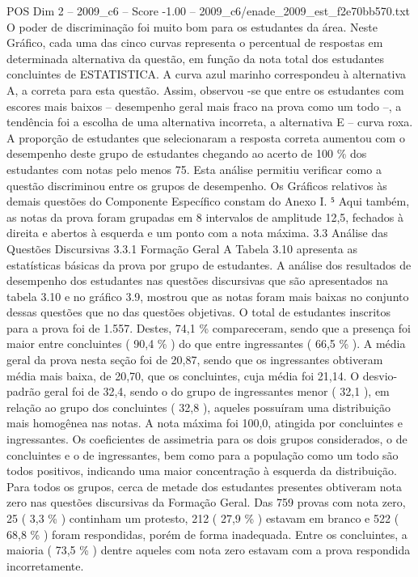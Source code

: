 \begin{textsample}{POS Dim 2 – 2009\_c6 – Score -1.00 – 2009\_c6/enade\_2009\_est\_f2e70bb570.txt}
O poder de discriminação foi muito bom para os estudantes da área.
Neste Gráfico, cada uma das cinco curvas representa o percentual de respostas em determinada alternativa da questão, em função da nota total dos estudantes concluintes de ESTATISTICA.
A curva azul marinho correspondeu à alternativa A, a correta para esta questão.
Assim, observou -se que entre os estudantes com escores mais baixos – desempenho geral mais fraco na prova como um todo –, a tendência foi a escolha de uma alternativa incorreta, a alternativa E – curva roxa.
A proporção de estudantes que selecionaram a resposta correta aumentou com o desempenho deste grupo de estudantes chegando ao acerto de 100 \% dos estudantes com notas pelo menos 75.
Esta análise permitiu verificar como a questão discriminou entre os grupos de desempenho.
Os Gráficos relativos às demais questões do Componente Específico constam do Anexo I. ⁵ Aqui também, as notas da prova foram grupadas em 8 intervalos de amplitude 12,5, fechados à direita e abertos à esquerda e um ponto com a nota máxima. 3.3 Análise das Questões Discursivas 3.3.1 Formação Geral A Tabela 3.10 apresenta as estatísticas básicas da prova por grupo de estudantes.
A análise dos resultados de desempenho dos estudantes nas questões discursivas que são apresentados na tabela 3.10 e no gráfico 3.9, mostrou que as notas foram mais baixas no conjunto dessas questões que no das questões objetivas.
O total de estudantes inscritos para a prova foi de 1.557.
Destes, 74,1 \% compareceram, sendo que a presença foi maior entre concluintes ( 90,4 \% ) do que entre ingressantes ( 66,5 \% ).
A média geral da prova nesta seção foi de 20,87, sendo que os ingressantes obtiveram média mais baixa, de 20,70, que os concluintes, cuja média foi 21,14.
O desvio-padrão geral foi de 32,4, sendo o do grupo de ingressantes menor ( 32,1 ), em relação ao grupo dos concluintes ( 32,8 ), aqueles possuíram uma distribuição mais homogênea nas notas.
A nota máxima foi 100,0, atingida por concluintes e ingressantes.
Os coeficientes de assimetria para os dois grupos considerados, o de concluintes e o de ingressantes, bem como para a população como um todo são todos positivos, indicando uma maior concentração à esquerda da distribuição.
Para todos os grupos, cerca de metade dos estudantes presentes obtiveram nota zero nas questões discursivas da Formação Geral.
Das 759 provas com nota zero, 25 ( 3,3 \% ) continham um protesto, 212 ( 27,9 \% ) estavam em branco e 522 ( 68,8 \% ) foram respondidas, porém de forma inadequada.
Entre os concluintes, a maioria ( 73,5 \% ) dentre aqueles com nota zero estavam com a prova respondida incorretamente.

\end{textsample}
